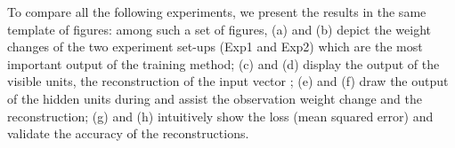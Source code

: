 {%
}
{%
}

\DIFdelend To compare all the following experiments, we present the results in the same template of figures:
among such a set of figures, (a) and (b) depict the weight changes of the two experiment set-ups (Exp1 and Exp2) which are the most important output of the training method;
(c) and (d) display the output of the visible units, the reconstruction of the input vector \DIFaddbegin {}\DIFaddend ;
(e) and (f) draw the output of the hidden units during \DIFdelbegin {}\DIFdelend \DIFaddbegin {}\DIFaddend and assist the observation \DIFdelbegin {}\DIFdelend \DIFaddbegin {}\DIFaddend weight change and the reconstruction;
(g) and (h) intuitively show the loss (\DIFaddbegin {}\DIFaddend mean squared error) and validate the accuracy of the reconstructions.

\DIFaddbegin {}

